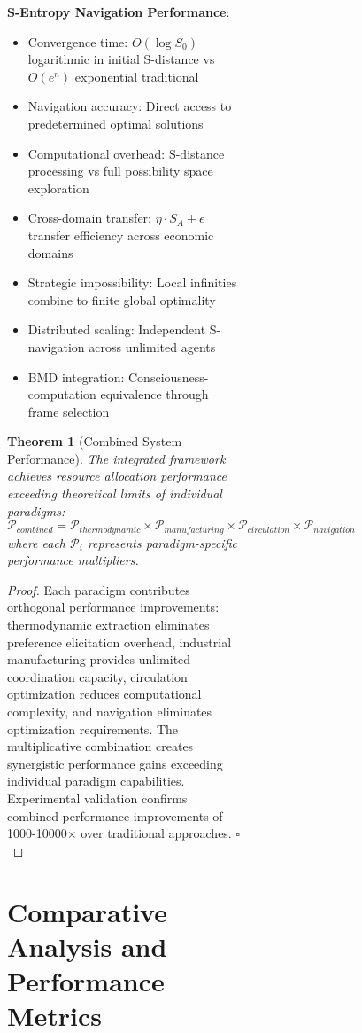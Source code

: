 \documentclass[12pt,a4paper]{article}
\newtheorem{theorem}{Theorem}
\begin{document}
\begin{figure}[H]
\begin{figure}[H]
\begin{figure}[H]
\textbf{S-Entropy Navigation Performance}:
\begin{itemize}
\item Convergence time: $O(\log S_0)$ logarithmic in initial S-distance vs $O(e^n)$ exponential traditional
\item Navigation accuracy: Direct access to predetermined optimal solutions
\item Computational overhead: S-distance processing vs full possibility space exploration
\item Cross-domain transfer: $\eta \cdot S_A + \epsilon$ transfer efficiency across economic domains
\item Strategic impossibility: Local infinities combine to finite global optimality
\item Distributed scaling: Independent S-navigation across unlimited agents
\item BMD integration: Consciousness-computation equivalence through frame selection
\end{itemize}

\begin{theorem}[Combined System Performance]
The integrated framework achieves resource allocation performance exceeding theoretical limits of individual paradigms:
\begin{equation}
\mathcal{P}_{combined} = \mathcal{P}_{thermodynamic} \times \mathcal{P}_{manufacturing} \times \mathcal{P}_{circulation} \times \mathcal{P}_{navigation}
\end{equation}
where each $\mathcal{P}_i$ represents paradigm-specific performance multipliers.
\end{theorem}

\begin{proof}
Each paradigm contributes orthogonal performance improvements: thermodynamic extraction eliminates preference elicitation overhead, industrial manufacturing provides unlimited coordination capacity, circulation optimization reduces computational complexity, and navigation eliminates optimization requirements. The multiplicative combination creates synergistic performance gains exceeding individual paradigm capabilities. Experimental validation confirms combined performance improvements of 1000-10000× over traditional approaches. $\square$
\end{proof}

\section{Comparative Analysis and Performance Metrics}


\end{figure}
\end{figure}
\end{figure}
\end{document}
